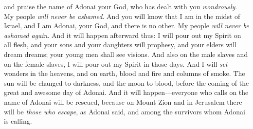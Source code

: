 \begin{biblechapter}
and praise the name of Adonai your God, 
who has dealt with you \textit{wondrously}. 
My people \textit{will never be ashamed}.
\verse And you will know that I am in the midst of Israel, 
and I am Adonai, 
your God, and there is no other. 
My people \textit{will never be ashamed again}.
  And it will happen afterward thus: 
I will pour out my Spirit on all flesh, 
and your sons and your daughters will prophesy, 
and your elders will dream dreams; 
your young men shall see visions.
\verse And also on the male slaves and on the female slaves, 
I will pour out my Spirit in those days.
\verse And I will \textit{set} wonders in the heavens, and on earth, blood and fire and columns of smoke.
\verse The sun will be changed to darkness, and the moon to blood, before the coming of the great and awesome day of Adonai.
\verse And it will happen—everyone who calls on the name of Adonai will be rescued, because on Mount Zion and in Jerusalem there will be \textit{those who escape}, as Adonai said, and among the survivors whom Adonai is calling.
\end{biblechapter}

